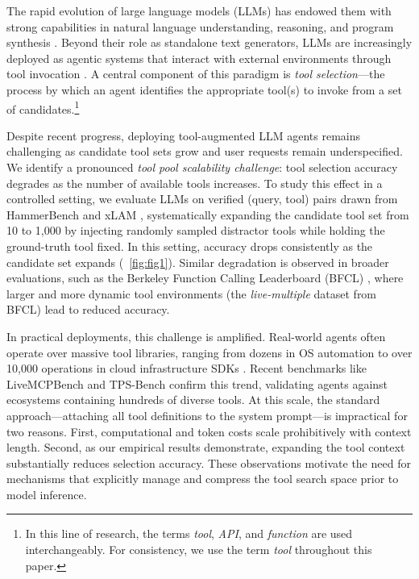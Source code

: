 \documentclass[11pt]{article}
\begin{document}
The rapid evolution of large language models (LLMs) has endowed them with strong capabilities in natural language understanding, reasoning, and program synthesis \citep{achiam2023gpt}. Beyond their role as standalone text generators, LLMs are increasingly deployed as agentic systems that interact with external environments through tool invocation \citep{huang2024planning, schick2023toolformer, yao2022webshop}. A central component of this paradigm is \textit{tool selection}---the process by which an agent identifies the appropriate tool(s) to invoke from a set of candidates.\footnote{In this line of research, the terms \textit{tool}, \textit{API}, and \textit{function} are used interchangeably. For consistency, we use the term \textit{tool} throughout this paper.}

Despite recent progress, deploying tool-augmented LLM agents remains challenging as candidate tool sets grow and user requests remain underspecified. We identify a pronounced \textit{tool pool scalability challenge}: tool selection accuracy degrades as the number of available tools increases. To study this effect in a controlled setting, we evaluate LLMs on verified (query, tool) pairs drawn from HammerBench \citep{wang2025hammerbench} and xLAM \citep{liu2024apigen}, systematically expanding the candidate tool set from 10 to 1,000 by injecting randomly sampled distractor tools while holding the ground-truth tool fixed. In this setting, accuracy drops consistently as the candidate set expands (~\ref{fig:fig1}). Similar degradation is observed in broader evaluations, such as the Berkeley Function Calling Leaderboard (BFCL) \citep{patilberkeley}, where larger and more dynamic tool environments (the \textit{live-multiple} dataset from BFCL) lead to reduced accuracy.


In practical deployments, this challenge is amplified. Real-world agents often operate over massive tool libraries, ranging from dozens in OS automation \cite{wu2024copilot} to over 10,000 operations in cloud infrastructure SDKs \cite{boto3}. Recent benchmarks like LiveMCPBench \cite{mo2025livemcpbench} and TPS-Bench \cite{xu2025tps} confirm this trend, validating agents against ecosystems containing hundreds of diverse tools. At this scale, the standard approach---attaching all tool definitions to the system prompt---is impractical for two reasons. First, computational and token costs scale prohibitively with context length. Second, as our empirical results demonstrate, expanding the tool context substantially reduces selection accuracy. These observations motivate the need for mechanisms that explicitly manage and compress the tool search space prior to model inference.
\end{document}
